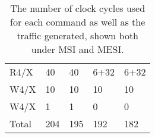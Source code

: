 \begin{table}[h]
\begin{tabular}{l|ll|ll}
R4/X                    & 40                      & 40                        & 6+32                    & 6+32                     \\
W4/X                    & 10                      & 10                        & 10                      & 10                       \\
W4/X                    & 1                       & 1                         & 0                       & 0                        \\ \hline
Total                   & 204                     & 195                       & 192                     & 182
\end{tabular}
\caption{The number of clock cycles used for each command as well as the traffic generated, shown both under MSI and MESI.}
\label{tab:t1ab}
\end{table}
